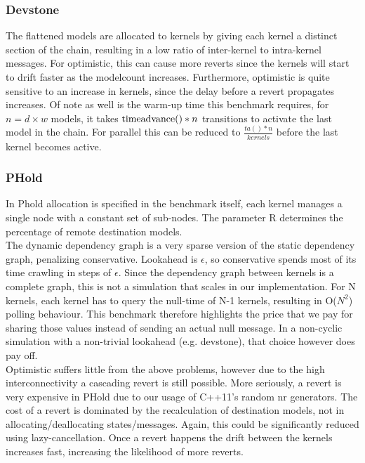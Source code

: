 \subsubsection{Devstone}
The flattened models are allocated to kernels by giving each kernel a distinct section of the chain, resulting in a low ratio of inter-kernel to intra-kernel messages. For optimistic, this can cause more reverts since the kernels will start to drift faster as the modelcount increases. Furthermore, optimistic is quite sensitive to an increase in kernels, since the delay before a revert propagates increases. Of note as well is the warm-up time this benchmark requires, for $n=d\times w$ models, it takes $\textup{timeadvance}()*n$ transitions to activate the last model in the chain. For parallel this can be reduced to $\frac{ta()*n}{kernels}$ before the last kernel becomes active.
\subsubsection{PHold}
In Phold \cite{PHOLD} allocation is specified in the benchmark itself, each kernel manages a single node with a constant set of sub-nodes. The parameter R determines the percentage of remote destination models.\\
The dynamic dependency graph is a very sparse version of the static dependency graph, penalizing conservative. Lookahead is $\epsilon$, so conservative spends most of its time crawling in steps of $\epsilon$. Since the dependency graph between kernels is a complete graph, this is not a simulation that scales in our implementation. For N kernels, each kernel has to query the null-time of N-1 kernels, resulting in O($N^2$) polling behaviour. This benchmark therefore highlights the price that we pay for sharing those values instead of sending an actual null message. In a non-cyclic simulation with a non-trivial lookahead (e.g. devstone), that choice however does pay off.\\
Optimistic suffers little from the above problems, however due to the high interconnectivity a cascading revert is still possible. More seriously, a revert is very expensive in PHold due to our usage of C++11's random nr generators. The cost of a revert is dominated by the recalculation of destination models, not in allocating/deallocating states/messages. Again, this could be significantly reduced using lazy-cancellation. Once a revert happens the drift between the kernels increases fast, increasing the likelihood of more reverts. 
